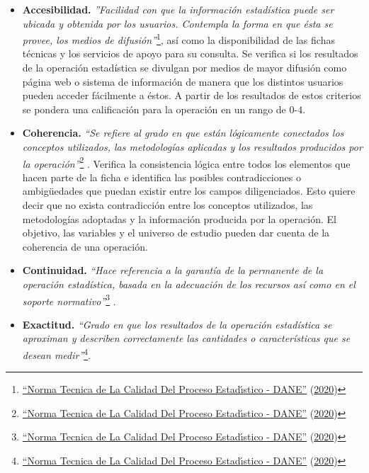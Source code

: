 \documentclass[
]{book}
\begin{document}
\begin{itemize}
  \begin{itemize}
  \item
    \textbf{Accesibilidad.} \emph{''Facilidad con que la información estadística puede ser ubicada y obtenida por los usuarios. Contempla la forma en que ésta se
    provee, los medios de difusión''}\footnote{\protect\hyperlink{ref-BibEntry2020Oct}{{``Norma Tecnica de La Calidad Del Proceso Estad{ı́}stico - DANE''}} (\protect\hyperlink{ref-BibEntry2020Oct}{2020})}, así como la
    disponibilidad de las fichas técnicas y los servicios
    de apoyo para su consulta. Se verifica si los
    resultados de la operación estadística se divulgan
    por medios de mayor difusión como página web o
    sistema de información de manera que los distintos
    usuarios pueden acceder fácilmente a éstos. A partir de los resultados de estos criterios se pondera una
    calificación para la operación en un rango de
    0-4.
  \item
    \textbf{Coherencia.} \emph{``Se refiere al grado en que están
    lógicamente conectados los conceptos utilizados,
    las metodologías aplicadas y los resultados
    producidos por la operación''}\footnote{\protect\hyperlink{ref-BibEntry2020Oct}{{``Norma Tecnica de La Calidad Del Proceso Estad{ı́}stico - DANE''}} (\protect\hyperlink{ref-BibEntry2020Oct}{2020})} . Verifica la
    consistencia lógica entre todos los elementos que
    hacen parte de la ficha e identifica las posibles
    contradicciones o ambigüedades que puedan existir
    entre los campos diligenciados. Esto quiere
    decir que no exista contradicción entre los conceptos
    utilizados, las metodologías adoptadas y la
    información producida por la operación. El objetivo,
    las variables y el universo de estudio pueden
    dar cuenta de la coherencia de una operación.
  \item
    \textbf{Continuidad.} \emph{``Hace referencia a la garantía de la permanente de la operación estadística, basada en la adecuación de los recursos así como en el soporte
    normativo''}\footnote{\protect\hyperlink{ref-BibEntry2020Oct}{{``Norma Tecnica de La Calidad Del Proceso Estad{ı́}stico - DANE''}} (\protect\hyperlink{ref-BibEntry2020Oct}{2020})} .
  \item
    \textbf{Exactitud.} \emph{``Grado en que los resultados de la
    operación estadística se aproximan y describen
    correctamente las cantidades o características que se
    desean medir''}\footnote{\protect\hyperlink{ref-BibEntry2020Oct}{{``Norma Tecnica de La Calidad Del Proceso Estad{ı́}stico - DANE''}} (\protect\hyperlink{ref-BibEntry2020Oct}{2020})}.

\end{itemize}
\end{itemize}
\end{document}
